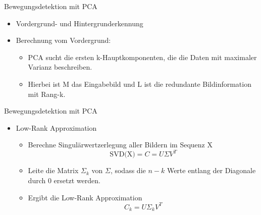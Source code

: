 \begin{frame}[t,fragile]{Bewegungsdetektion mit PCA}
	\begin{itemize}
 \item Vordergrund- und Hintergrunderkennung
 \item Berechnung vom Vordergrund:
 \begin{itemize}
  \item{PCA sucht die ersten k-Hauptkomponenten, die die Daten mit maximaler Varianz beschreiben.}
  \item{Hierbei ist M das Eingabebild und L ist die redundante Bildinformation mit Rang-k.} 
 \end{itemize}
\end{itemize}
  
\end{frame}


\begin{frame}[t,fragile]{Bewegungsdetektion mit  PCA}
	\begin{itemize}
    \item{Low-Rank Approximation}
\begin{itemize}
    
 \item{Berechne Singulärwertzerlegung aller Bildern im Sequenz X}
 \begin{equation}
\text{SVD(X)}= C = U\Sigma V^T
\end{equation}
 \item{Leite die Matrix ${\Sigma_k}$ von ${\Sigma}$, sodass die ${n - k}$ Werte entlang der Diagonale durch 0 ersetzt werden.}
 \item{Ergibt die Low-Rank Approximation}
\begin{equation}
C_k = U\Sigma_kV^T
\end{equation}

      \end{itemize}
  \end{itemize}
\end{frame}


